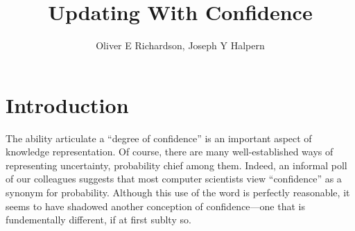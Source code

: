 \documentclass{article}
\title{Updating With Confidence}
\author{Oliver E Richardson, Joseph Y Halpern}
\begin{document}
\maketitle

\tableofcontents
\clearpage

\section{Introduction}

\def\stmt{$A$}


The ability articulate a ``degree of confidence'' is an important aspect of knowledge representation.
Of course, there are many well-established ways of representing uncertainty,
	probability chief among them.
Indeed, an informal poll of our colleagues suggests that most computer scientists view ``confidence'' as a synonym for probability.
Although this use of the word is perfectly reasonable, it seems to have shadowed another conception of confidence---one that is fundementally different, if at first sublty so. 
 
\end{document}
